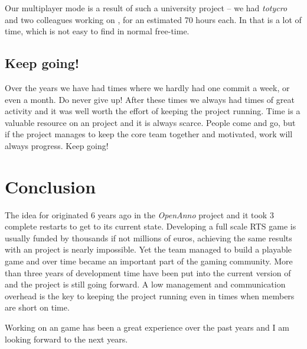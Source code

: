 Our multiplayer mode is a result of such a university project -- we had \textit{totycro} and two colleagues working on \UH{}, for an
estimated 70 hours each. In \OS{} that is a lot of time, which is not easy to find in normal free-time.

\subsection{Keep going!}
Over the years we have had times where we hardly had one commit a week, or even a month. Do never give up! After these
times we always had times of great activity and it was well worth the effort of keeping the project running. Time is a
valuable resource on an \OS{} project and it is always scarce. People come and go, but if the project manages to keep
the core team together and motivated, work will always progress. Keep going!

\pagebreak{}

\section{Conclusion}
The idea for \UH{} originated 6 years ago in the \textit{OpenAnno} project and it took 3 complete restarts to get to its
current state. Developing
a full scale RTS game is usually funded by thousands if not millions of euros, achieving the same results with an \OS{}
project is nearly impossible. Yet the team managed to build a playable game and over time became an important part of
the \OS{} gaming community. More than three years of development time have been put into the current version of \UH{} and the
project is still going forward. A low management and communication overhead is the key to keeping the project running
even in times when members are short on time.

Working on an \OS{} game has been a great experience over the past years and I am looking forward to the next years.


